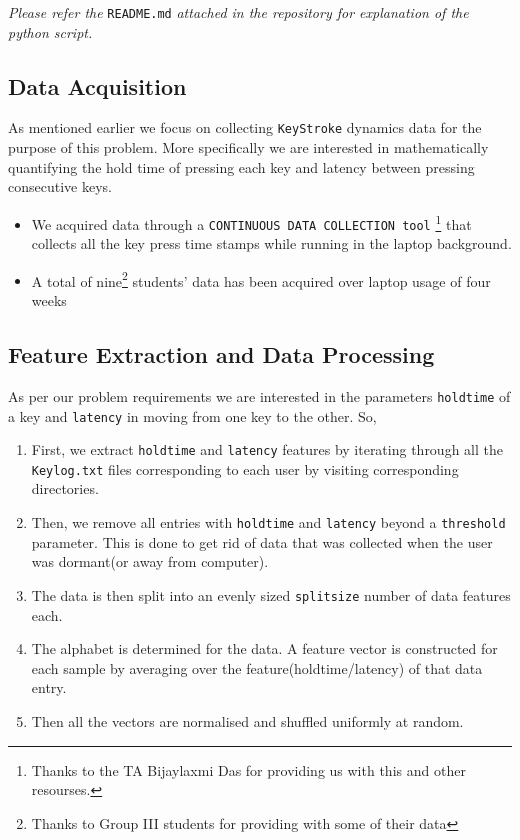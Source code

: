 \documentclass[a4paper,10pt]{article}
\begin{document}
\noindent \textit{Please refer the} \texttt{README.md} \textit{attached in the repository for explanation of the python script.}

\subsection{Data Acquisition}

As mentioned earlier we focus on collecting \texttt{KeyStroke} dynamics data for the purpose of this problem. More specifically we are interested in mathematically quantifying the hold time of pressing each key and latency between pressing consecutive keys. 
\begin{itemize}
	\item We acquired data through a \texttt{CONTINUOUS DATA COLLECTION tool} \footnote{Thanks to the TA Bijaylaxmi Das for providing us with this and other resourses.} that collects all the key press time stamps while running in the laptop background.
	\item A total of nine\footnote{Thanks to Group III students for providing with some of their data} students' data has been acquired over laptop usage of four weeks
\end{itemize}

\subsection{Feature Extraction and Data Processing}
As per our problem requirements we are interested in the parameters \texttt{holdtime} of a key and \texttt{latency} in moving from one key to the other. So,
\begin{enumerate}
	\item First, we extract \texttt{holdtime} and \texttt{latency} features by iterating through all the \texttt{Keylog.txt} files corresponding to each user by visiting corresponding directories.
	\item Then, we remove all entries with \texttt{holdtime} and \texttt{latency} beyond a \texttt{threshold} parameter. This is done to get rid of data that was collected when the user was dormant(or away from computer).
	\item The data is then split into an evenly sized \texttt{splitsize} number of data features each.
	\item The alphabet is determined for the data. A feature vector is constructed for each sample by averaging over the feature(holdtime/latency) of that data entry.
	\item Then all the vectors are normalised and shuffled uniformly at random.
\end{enumerate}
\end{document}

